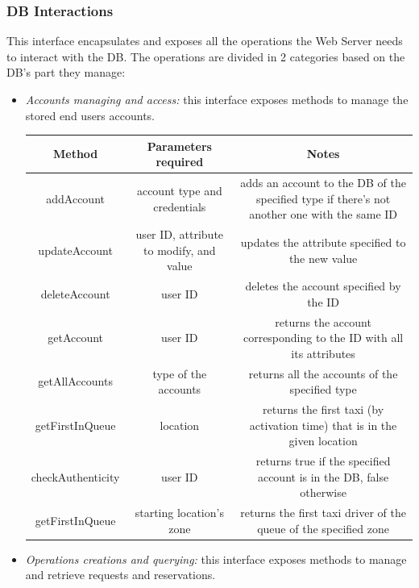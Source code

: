 \documentclass{article}
\begin{document}
\subsubsection{DB Interactions}
This interface encapsulates and exposes all the operations the Web Server needs to interact with the DB\@. The operations are divided in 2 categories based on the DB's part they manage:
\begin{itemize}	
	\item \textit{Accounts managing and access:} this interface exposes methods to manage the stored end users accounts.\\	
	\begin{table}[H]
		\begin{adjustbox}{width=1.2\textwidth}
			\begin{tabular}{*{3}{c}}
				\toprule
				Method & Parameters required & Notes \\
				\midrule
				addAccount & account type and credentials & adds an account to the DB of the specified type if there's not another one with the same ID\\
				updateAccount & user ID, attribute to modify, and value & updates the attribute specified to the new value\\ 
				deleteAccount & user ID & deletes the account specified by the ID \\
				getAccount & user ID & returns the account corresponding to the ID with all its attributes \\
				getAllAccounts & type of the accounts & returns all the accounts of the specified type \\
				getFirstInQueue & location & returns the first taxi (by activation time) that is in the given location\\
				checkAuthenticity & user ID & returns true if the specified account is in the DB, false otherwise \\
				getFirstInQueue & starting location's zone & returns the first taxi driver of the queue of the specified zone \\
				\bottomrule
			\end{tabular}	
		\end{adjustbox}
	\end{table}
\item \textit{Operations creations and querying:} this interface exposes methods to manage and retrieve requests and reservations.\\	
	\begin{table}[H]
		\begin{adjustbox}{width=1.2\textwidth}

\end{adjustbox}
\end{table}
\end{itemize}
\end{document}
